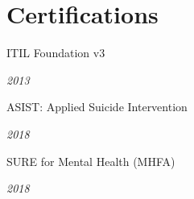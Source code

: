 \section{Certifications} %
\small{%

\parbox[t][][t]{\linewidth}{
	\parbox{\linewidth}{ITIL Foundation v3}}
	\smallbreak
	\parbox{\linewidth}{{\textit{2013}}}
	\bigbreak
}

\parbox[t][][t]{\linewidth}{
	\parbox{\linewidth}{ASIST: Applied Suicide Intervention}
	\smallbreak
	\parbox{\linewidth}{{\textit{2018}}}
	\bigbreak
}

\parbox[t][][t]{\linewidth}{
	\parbox{\linewidth}{SURE for Mental Health (MHFA)}
	\smallbreak
	\parbox{\linewidth}{{\textit{2018}}}
}

